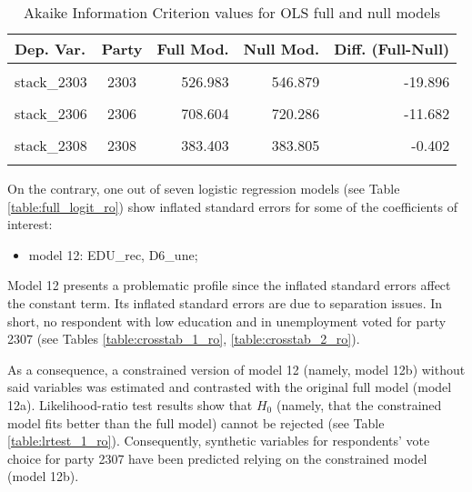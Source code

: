 \documentclass[
]{article}
\providecommand{\tightlist}{%
  \setlength{\itemsep}{0pt}\setlength{\parskip}{0pt}}
\begin{document}
\begin{table}[!h]

\caption{\label{tab:unnamed-chunk-149}Akaike Information Criterion values for OLS full and null models 
        \label{table:ols_aic_ro}}
\centering
\begin{tabular}[t]{lcrrr}
\toprule
Dep. Var. & Party & Full Mod. & Null Mod. & Diff. (Full-Null)\\
\midrule
\cellcolor{gray!6}{stack\_2301} & \cellcolor{gray!6}{2301} & \cellcolor{gray!6}{553.736} & \cellcolor{gray!6}{625.062} & \cellcolor{gray!6}{-71.326}\\
stack\_2303 & 2303 & 526.983 & 546.879 & -19.896\\
\cellcolor{gray!6}{stack\_2305} & \cellcolor{gray!6}{2305} & \cellcolor{gray!6}{344.164} & \cellcolor{gray!6}{365.221} & \cellcolor{gray!6}{-21.057}\\
stack\_2306 & 2306 & 708.604 & 720.286 & -11.682\\
\cellcolor{gray!6}{stack\_2307} & \cellcolor{gray!6}{2307} & \cellcolor{gray!6}{-105.959} & \cellcolor{gray!6}{-84.132} & \cellcolor{gray!6}{-21.826}\\
\addlinespace
stack\_2308 & 2308 & 383.403 & 383.805 & -0.402\\
\cellcolor{gray!6}{stack\_2302} & \cellcolor{gray!6}{2302} & \cellcolor{gray!6}{693.376} & \cellcolor{gray!6}{721.675} & \cellcolor{gray!6}{-28.299}\\
\bottomrule
\end{tabular}
\end{table}

On the contrary, one out of seven logistic regression models (see Table \ref{table:full_logit_ro}) show
inflated standard errors for some of the coefficients of interest:

\begin{itemize}
\tightlist
\item
  model 12: EDU\_rec, D6\_une;
\end{itemize}

Model 12 presents a problematic profile since the inflated standard errors affect the constant term. Its inflated standard errors are due to separation issues. In short, no respondent with low
education and in unemployment voted for party 2307 (see Tables \ref{table:crosstab_1_ro}, \ref{table:crosstab_2_ro}).

As a consequence, a constrained version of model 12 (namely, model 12b) without said variables was
estimated and contrasted with the original full model (model 12a). Likelihood-ratio test results show
that \(H_0\) (namely, that the constrained model fits better than the full model) cannot be rejected
(see Table \ref{table:lrtest_1_ro}). Consequently, synthetic variables for respondents' vote choice for
party 2307 have been predicted relying on the constrained model (model 12b).
\end{document}
